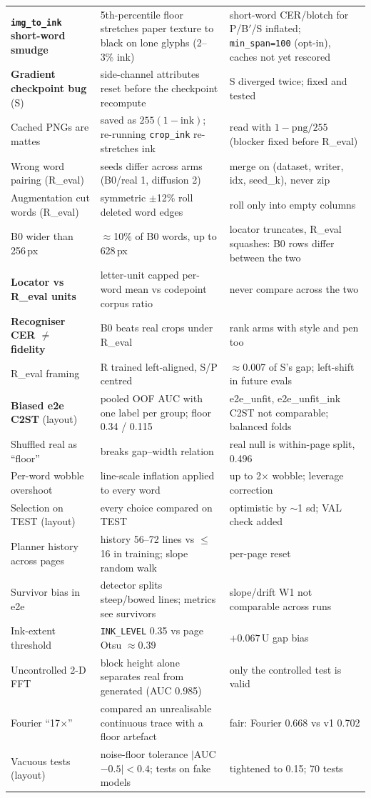 \documentclass[10.5pt,a4paper]{article}
\newcommand{\Bp}{B$'$}
\newcommand{\U}{\,U}
\begin{document}
\begin{longtable}{@{}p{3.5cm}p{6.6cm}p{5.4cm}@{}}
\textbf{\texttt{img\_to\_ink} short-word smudge} & 5th-percentile floor stretches paper texture to black on lone glyphs (2--3\% ink) & short-word CER/blotch for P/\Bp/S inflated; \texttt{min\_span=100} (opt-in), caches not yet rescored \\
\textbf{Gradient checkpoint bug} (S) & side-channel attributes reset before the checkpoint recompute & S diverged twice; fixed and tested \\
Cached PNGs are mattes & saved as $255(1-\text{ink})$; re-running \texttt{crop\_ink} re-stretches ink & read with $1-\mathrm{png}/255$ (blocker fixed before R\_eval) \\
Wrong word pairing (R\_eval) & seeds differ across arms (B0/real 1, diffusion 2) & merge on (dataset, writer, idx, seed\_k), never zip \\
Augmentation cut words (R\_eval) & symmetric $\pm$12\% roll deleted word edges & roll only into empty columns \\
B0 wider than 256\,px & $\approx$10\% of B0 words, up to 628\,px & locator truncates, R\_eval squashes: B0 rows differ between the two \\
\textbf{Locator vs R\_eval units} & letter-unit capped per-word mean vs codepoint corpus ratio & never compare across the two \\
\textbf{Recogniser CER $\neq$ fidelity} & B0 beats real crops under R\_eval & rank arms with style and pen too \\
R\_eval framing & R trained left-aligned, S/P centred & $\approx$0.007 of S's gap; left-shift in future evals \\
\midrule
\textbf{Biased e2e C2ST} (layout) & pooled OOF AUC with one label per group; floor 0.34 / 0.115 & e2e\_unfit, e2e\_unfit\_ink C2ST not comparable; balanced folds \\
Shuffled real as ``floor'' & breaks gap--width relation & real null is within-page split, 0.496 \\
Per-word wobble overshoot & line-scale inflation applied to every word & up to 2$\times$ wobble; leverage correction \\
Selection on TEST (layout) & every choice compared on TEST & optimistic by $\sim$1 sd; VAL check added \\
Planner history across pages & history 56--72 lines vs $\le$16 in training; slope random walk & per-page reset \\
Survivor bias in e2e & detector splits steep/bowed lines; metrics see survivors & slope/drift W1 not comparable across runs \\
Ink-extent threshold & \texttt{INK\_LEVEL} 0.35 vs page Otsu $\approx$0.39 & $+0.067$\U{} gap bias \\
Uncontrolled 2-D FFT & block height alone separates real from generated (AUC 0.985) & only the controlled test is valid \\
Fourier ``17$\times$'' & compared an unrealisable continuous trace with a floor artefact & fair: Fourier 0.668 vs v1 0.702 \\
Vacuous tests (layout) & noise-floor tolerance $|$AUC$-0.5|<0.4$; tests on fake models & tightened to 0.15; 70 tests \\
\end{longtable}
\end{document}
